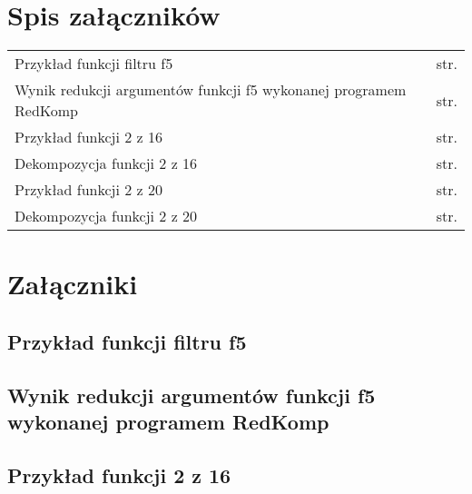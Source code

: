\chapter*{Spis załączników}
\noindent

\begin{tabularx}{\textwidth}{Xl}

Przykład funkcji filtru f5 & str. \pageref{file:f5.pla} \\
Wynik redukcji argumentów funkcji f5 wykonanej programem RedKomp & str. \pageref{file:f5.txt} \\

Przykład funkcji 2 z 16 & str. \pageref{file:2outof16.pla} \\
Dekompozycja funkcji 2 z 16 & str. \pageref{file:2outof16.txt} \\

Przykład funkcji 2 z 20 & str. \pageref{file:2outof20.pla} \\
Dekompozycja funkcji 2 z 20 & str. \pageref{file:2outof20.txt} \\
\end{tabularx}

\chapter*{Załączniki}
\section*{Przykład funkcji filtru f5}
\label{file:f5.pla}

\clearpage
\section*{Wynik redukcji argumentów funkcji f5 wykonanej programem RedKomp}
\label{file:f5.txt}

\clearpage

\section*{Przykład funkcji 2 z 16}
\label{file:2outof16.pla}

\clearpage

